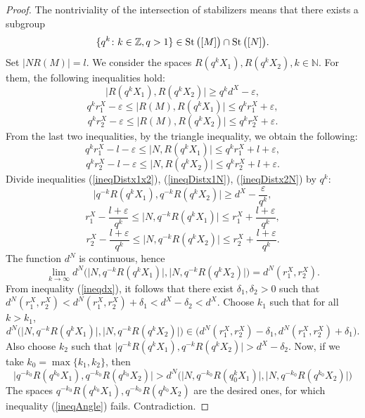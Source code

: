 \documentclass[leqno]{article}
\begin{document}
\begin{proof}
    The nontriviality of the intersection of stabilizers means that there
    exists a subgroup \[
        \{q^k \colon k\in \mathbb{Z}, q> 1\} \in \operatorname{St}\big([M]\big) \cap \operatorname{St}
        \big([N]\big).
    \]
    Set \( |N R(M)| = l \). We consider the spaces \(
    R(q^k X_1), R(q^k X_2), k \in \mathbb{N} \). For them, the following
    inequalities hold:
    \begin{equation}
        \big| R(q^k X_1), R(q^k X_2) \big| \ge q^k d^X - \varepsilon,
        \label{ineqDistx1x2}
    \end{equation}
    \[
        q^k r_1^X - \varepsilon  \le\big | R(M), R(q^k X_1) \big| \le q^k
        r_1^X + \varepsilon ,
    \]
    \[
        q^k r_2^X - \varepsilon  \le\big | R(M), R(q^k X_2) \big| \le q^k
        r_2^X + \varepsilon .
    \]
    From the last two inequalities, by the triangle inequality, we obtain
    the following:
    \begin{equation}
        q^k r_1^X - l - \varepsilon \le \big|N, R(q^k X_1) \big| \le
        q^k r_1^X + l + \varepsilon,\label{ineqDistx1N}
    \end{equation}
    \begin{equation}
        q^k r_2^X - l - \varepsilon \le \big|N, R(q^k X_2) \big| \le q^k
        r_2^X + l + \varepsilon.\label{ineqDistx2N}
    \end{equation}
    Divide inequalities (\ref{ineqDistx1x2}), (\ref{ineqDistx1N}),
    (\ref{ineqDistx2N}) by \( q^k \):
    \[ \big| q^{-k}R(q^k X_1), q^{-k}R(q^k X_2) \big| \ge d^X -
    \frac{\varepsilon }{q^k}, \]
    \[
        r_1^X - \frac{l + \varepsilon}{q^k} \le \big|N, q^{-k}R(q^k X_1)
        \big| \le
        r_1^X + \frac{l + \varepsilon}{q^k},
    \]
    \[
        r_2^X - \frac{l + \varepsilon}{q^k} \le \big|N, q^{-k}R(q^k X_2)
        \big| \le
        r_2^X + \frac{l + \varepsilon}{q^k}.
    \]
    The function \( d^N \) is continuous, hence
    \[
        \lim_{k \rightarrow \infty
        }d^N\Big(\big|N, q^{-k}R(q^k X_1)
            \big|, \big|N, q^{-k}R(q^k X_2)
        \big|\Big) = d^N(r_1^X, r_2^X).
    \]
    From inequality (\ref{ineqdx}), it follows that there exist \( \delta
        _1, \delta _2
    > 0 \) such that \( d^N(r_1^X,r_2^X)<d^N(r_1^X, r_2^X)+\delta
    _1 < d^X- \delta _2 < d^X \). Choose \( k_1 \) such that
    for all \( k > k_1 \),
    \[
        d^N\Big(\big|N, q^{-k}R(q^k X_1)
            \big|, \big|N, q^{-k}R(q^k X_2)
        \big|\Big) \in \big(d^N(r_1^X, r_2^X)- \delta _1,
    d^N(r_1^X, r_2^X)+ \delta _1\big).  \]
    Also choose \( k_2 \) such that \( \big| q^{-k}R(q^k X_1),
    q^{-k}R(q^k X_2) \big| > d^X - \delta _2 \).
    Now, if we take \( k_0 = \max\{k_1,k_2\} \), then
    \[ \big| q^{-k_0}R(q^{k_0} X_1), q^{-k_0}R(q^{k_0} X_2) \big|
        > d^N\Big(\big|N, q^{-k_0}R(q^k_0 X_1) \big|, \big|N,
    q^{-k_0}R(q^{k_0} X_2) \big|\Big) \]
    The spaces \( q^{-k_0}R(q^{k_0}X_1), q^{-k_0}R(q^{k_0}X_2)\)
    are the desired ones, for which inequality (\ref{ineqAngle}) fails.
    Contradiction.
\end{proof}
\end{document}
